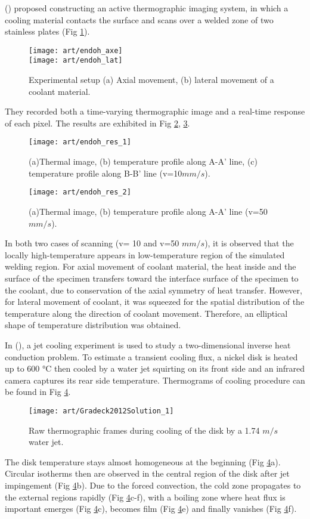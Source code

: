 (\citet{endohdynamical2012}) proposed constructing an active thermographic imaging system, in which a cooling material contacts the surface and scans over a welded zone of two stainless plates (Fig \ref{endoh_fig}).
\begin{figure}[!htbp]
	\centering
	\texttt{[image: art/endoh\_axe]}\\
	\texttt{[image: art/endoh\_lat]}
	\caption{ Experimental setup (a) Axial movement, (b) lateral movement of a coolant material.}
	\label{endoh_fig}
\end{figure}
They recorded both a time-varying thermographic image and a real-time response of each pixel. The results are exhibited in Fig \ref{endoh_res_1}, \ref{endoh_res_2}.
\begin{figure}[!htbp]
	\centering
	\texttt{[image: art/endoh\_res\_1]}
	\caption{(a)Thermal image, (b) temperature profile along A-A’ line, (c) temperature profile along B-B’ line (v=10$mm/s$).}
	\label{endoh_res_1}
\end{figure}
\begin{figure}[!htbp]
	\centering
	\texttt{[image: art/endoh\_res\_2]}
	\caption{(a)Thermal image, (b) temperature profile along A-A’ line (v=50$ mm/s$).}
	\label{endoh_res_2}
\end{figure}

In both two cases of scanning (v= 10 and v=50 $mm/s$), it is observed that the locally high-temperature appears in low-temperature region of the simulated welding region. For axial movement of coolant material, the heat inside and the surface of the specimen transfers toward the interface surface of the specimen to the coolant, due to conservation of the axial symmetry of heat transfer. However, for lateral movement of coolant, it was squeezed for the spatial distribution of the temperature along the direction of coolant movement. Therefore, an elliptical shape of temperature distribution was obtained.

In (\citet{Gradeck2012Solution}),  a jet cooling experiment is used to study a two-dimensional inverse heat conduction problem. To estimate a transient cooling flux, a nickel disk is heated up to 600 °C then cooled by a water jet squirting on its front side and an infrared camera captures its rear side temperature. Thermograms of cooling procedure can be found in Fig \ref{Gradeck2012Solution_1}.
\begin{figure}
	\centering
	\texttt{[image: art/Gradeck2012Solution\_1]}
	\caption{Raw thermographic frames during cooling of the disk by a 1.74 $ m/s $ water jet.}
	\label{Gradeck2012Solution_1}
\end{figure}
The disk temperature stays almost homogeneous at the beginning (Fig \ref{Gradeck2012Solution_1}a). Circular isotherms then are observed in the central region of the disk after jet impingement (Fig \ref{Gradeck2012Solution_1}b). Due to the forced convection, the cold zone propagates to the external regions rapidly (Fig \ref{Gradeck2012Solution_1}c-f), with a boiling zone where heat flux is important emerges (Fig \ref{Gradeck2012Solution_1}c), becomes film (Fig \ref{Gradeck2012Solution_1}e) and finally vanishes (Fig \ref{Gradeck2012Solution_1}f).

